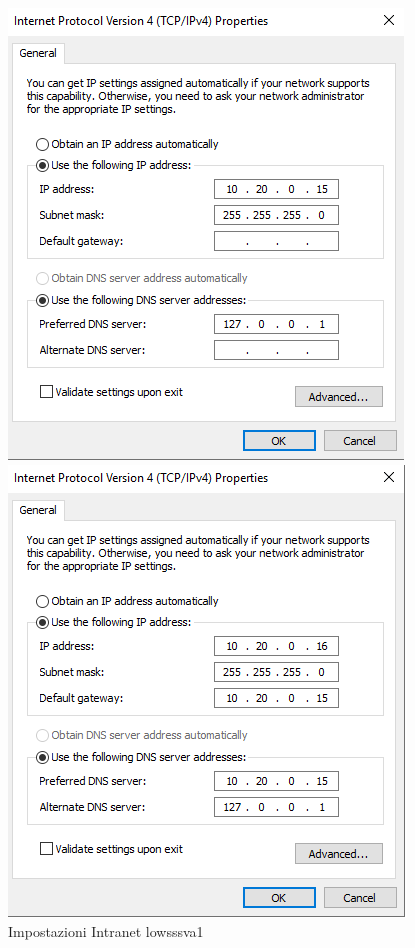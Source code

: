 \documentclass[../main.tex]{subfiles}
\begin{document}
\begin{figure}[h]
  \centering
  \begin{minipage}[h]{0.4\textwidth}
    \includegraphics[width=\textwidth]{Images/intanetServer1.PNG}
    \caption{Impostazioni Intranet lowsssva1}
  \end{minipage}
  \hfill
  \begin{minipage}[h]{0.4\textwidth}
    \includegraphics[width=\textwidth]{Images/intranet.PNG}

\end{minipage}
\end{figure}
\end{document}
